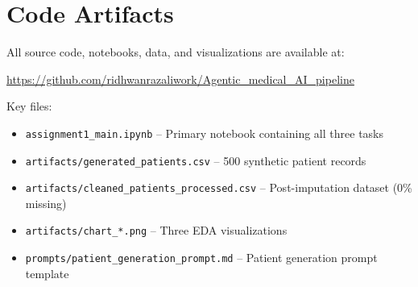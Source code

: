 \documentclass[10pt,a4paper]{article}
\begin{document}
\appendix

\section{Code Artifacts}

All source code, notebooks, data, and visualizations are available at:
\begin{center}
\url{https://github.com/ridhwanrazaliwork/Agentic_medical_AI_pipeline}
\end{center}

Key files:
\begin{itemize}
    \item \texttt{assignment1\_main.ipynb} -- Primary notebook containing all three tasks
    \item \texttt{artifacts/generated\_patients.csv} -- 500 synthetic patient records
    \item \texttt{artifacts/cleaned\_patients\_processed.csv} -- Post-imputation dataset (0\% missing)
    \item \texttt{artifacts/chart\_*.png} -- Three EDA visualizations
    \item \texttt{prompts/patient\_generation\_prompt.md} -- Patient generation prompt template
\end{itemize}
\end{document}
